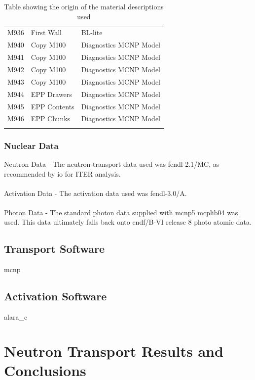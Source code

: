 \documentclass[12pt]{article}
\begin{document}
\begin{centering}
\begin{longtable}[ht!]{ p{} | p{} | p{} }
  M936 & First Wall & BL-lite \\
  M940 & Copy M100 & Diagnostics MCNP Model \\
  M941 & Copy M100 & Diagnostics MCNP Model \\
  M942 & Copy M100 & Diagnostics MCNP Model \\
  M943 & Copy M100 & Diagnostics MCNP Model \\
  M944 & EPP Drawers & Diagnostics MCNP Model \\
  M945 & EPP Contents & Diagnostics MCNP Model \\
  M946 & EPP Chunks & Diagnostics MCNP Model \\
 \caption{Table showing the origin of the material descriptions used}
 \label{tab:material_origin}
 \end{longtable}
\end{centering}

\subsubsection*{Nuclear Data}
Neutron Data - The neutron transport data used was \gls{fendl}-2.1/MC, as 
recommended by \gls{io} for ITER analysis. 
\\
\\
Activation Data - The activation data used was \gls{fendl}-3.0/A.
\\
\\
Photon Data - The standard photon data supplied with \gls{mcnp}5 mcplib04 was 
used. This data ultimately falls back onto \gls{endf}/B-VI release 8 photo
atomic data.
\subsection{Transport Software}
\gls{mcnp}
\subsection{Activation Software}
\gls{alara_c}
\newpage
\clearpage
\section{Neutron Transport Results and Conclusions}
\end{document}
